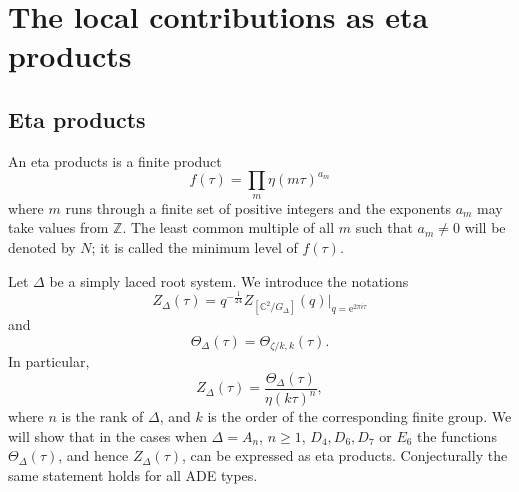\documentclass[11pt,a4paper]{amsart}
\theoremstyle{definition}
\newcommand{\SZ}{\mathbb{Z}}                    %
\newcommand{\SC}{\mathbb{C}}                    %
\begin{document}
\section{The local contributions as eta products}
\label{sec:locetaprod}

\subsection{Eta products}
An eta products is a finite product
\begin{equation} f(\tau)=\prod_m \eta(m \tau )^{a_m} 
\label{eq:etaproddef}
\end{equation}
where $m$ runs through a finite set of positive integers and the exponents
$a_m$ may take values from $\SZ$. The least common multiple of all $m$ such that $a_m\neq 0$ will be denoted by $N$; it is called the minimum level of $f(\tau)$.

Let $\Delta$ be a simply laced root system. We introduce the notations
\[ Z_{\Delta}(\tau)=q^{-\frac{1}{24}}Z_{[\SC^2/G_\Delta]}(q)\Big|_{q=\mathrm{e}^{2 \pi i \tau}}  \]
and 
\[  \Theta_{\Delta}(\tau)=\Theta_{ \zeta/k ,k}(\tau ). \]
In particular,
\[ Z_{\Delta}(\tau)=\frac{\Theta_{\Delta}(\tau)}{\eta(k\tau)^n}, \]
where $n$ is the rank of $\Delta$, and $k$ is the order of the corresponding finite group.
We will show that in the cases when $\Delta=A_n$, $n\geq 1$, $D_4, D_6, D_7$ or $E_6$ the functions $\Theta_{\Delta}(\tau)$, and hence $Z_{\Delta}(\tau)$, can be expressed as eta products. Conjecturally the same statement holds for all ADE types.
\end{document}
